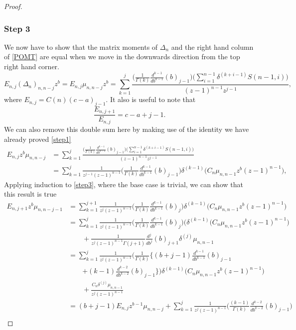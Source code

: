 \documentclass[12pt]{article}
\numberwithin{figure}{section}
\numberwithin{equation}{section}
\numberwithin{table}{section}
\begin{document}
\begin{proof}
\subsubsection{Step 3}
We now have to show that the matrix moments of $\Delta_n$ and the right hand column of \eqref{POMT} are equal when we move in the downwards direction from the top right hand corner.
$$E_{n,j}(\Delta_{n})_{n,n-j}z^b=E_{n,j}\mu_{n,n-j}z^b=\sum^j_{k=1}\frac{\big(\frac{1}{\Gamma(k)}\frac{d^{k-1}}{db^{k-1}}(b)_{j-1}\big)
\big(\sum^{n-1}_{i=1}\delta^{(k+i-1)}S(n-1,i)\big)}{(z-1)^{n-1}z^{j-1}},$$
where $E_{n,j}=C(n)(c-a)_{j-1}$. It also is useful to note that $$\frac{E_{n,j+1}}{E_{n,j}}=c-a+j-1.$$
We can also remove this double sum here by making use of the identity we have already proved \eqref{step1}
\begin{align}\nonumber
E_{n,j}z^b\mu_{n,n-j}&=\sum^j_{k=1}\frac{\big(\frac{1}{\Gamma(k)}\frac{d^{k-1}}{db^{k-1}}(b)_{j-1}\big)\big(\sum^{n-1}_{i=1}
\delta^{(k+i-1)}S(n-1,i)\big)}{(z-1)^{n-1}z^{j-1}}\\
&=\sum^j_{k=1}\frac{1}{z^{j-1}(z-1)^{n-1}}{\bigg(\frac{1}{\Gamma(k)}\frac{d^{k-1}}{db^{k-1}}(b)_{j-1}\bigg)\delta^{(k-1)}\big(C_{n}
\mu_{n,n-1}z^b(z-1)^{n-1}\big)},\label{step3}
\end{align}
Applying induction to \eqref{step3}, where the base case is trivial, we can show that this result is true
\begin{align*}
E_{n,j+1}z^b\mu_{n,n-j-1}&=\sum^{j+1}_{k=1}\frac{1}{z^{j}(z-1)^{n-1}}{\bigg(\frac{1}{\Gamma(k)}\frac{d^{k-1}}{db^{k-1}}(b)_{j}\bigg)
\delta^{(k-1)}\big(C_{n}\mu_{n,n-1}z^b(z-1)^{n-1}\big)}\\
&=\sum^{j}_{k=1}\frac{1}{z^{j}(z-1)^{n-1}}{\bigg(\frac{1}{\Gamma(k)}\frac{d^{k-1}}{db^{k-1}}(b)_{j}\bigg)(\delta^{(k-1)}\big(C_{n}
\mu_{n,n-1}z^b(z-1)^{n-1}\big)}\\
&\qquad+\frac{1}{z^{j}(z-1)^{n-1}\Gamma(j+1)}\frac{d^j}{db^j}(b)_{j+1}\delta^{(j)}\mu_{n,n-1}\\
&=\sum^{j}_{k=1}\frac{1}{z^{j}(z-1)^{n-1}}{\bigg(\frac{1}{\Gamma(k)}\big\{(b+j-1)\frac{d^{k-1}}{db^{k-1}}(b)_{j-1}}\\
&\qquad{+(k-1)\frac{d^{k-2}}{db^{k-2}}(b)_{j-1}\big\}\bigg)\delta^{(k-1)}\big(C_{n}\mu_{n,n-1}z^b(z-1)^{n-1}\big)}\\
&\qquad+\frac{C_n\delta^{(j)}\mu_{n,n-1}}{z^{j}(z-1)^{n-1}}\\
&=(b+j-1)E_{n,j}z^{b-1}\mu_{n,n-j}\!+\!\sum^{j}_{k=1}\frac{1}{z^{j}(z-1)^{n-1}}{\big(\frac{(k-1)}{\Gamma(k)}\frac{d^{k-2}}{db^{k-2}}(b)_{j-1}\big)}\\

\end{align*}
\end{proof}
\end{document}

